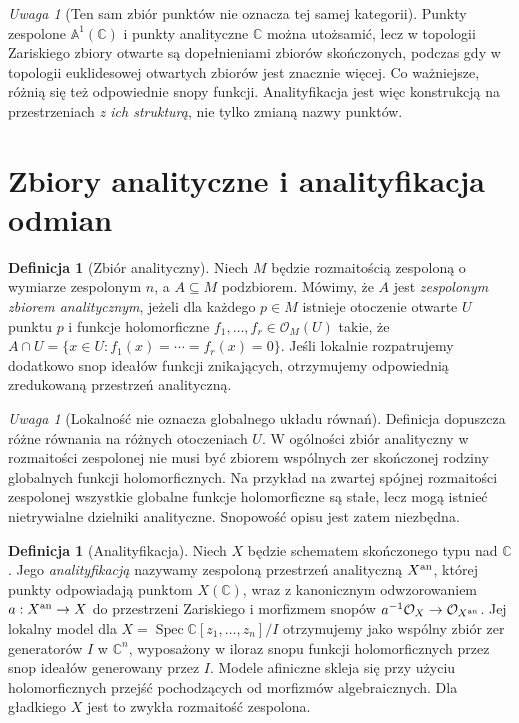 \documentclass[11pt,a4paper,openany]{report}
\numberwithin{equation}{section}
\theoremstyle{plain}
\theoremstyle{definition}
\newtheorem{definicja}[twierdzenie]{Definicja}
\theoremstyle{remark}
\newtheorem{uwaga}[twierdzenie]{Uwaga}
\newcommand{\C}{\mathbb C}
\newcommand{\A}{\mathbb A}
\begin{document}
\begin{uwaga}[Ten sam zbiór punktów nie oznacza tej samej kategorii]
Punkty zespolone $\A^1(\C)$ i punkty analityczne $\C$ można utożsamić,
lecz w topologii Zariskiego zbiory otwarte są dopełnieniami zbiorów
skończonych, podczas gdy w topologii euklidesowej otwartych zbiorów jest
znacznie więcej. Co ważniejsze, różnią się też odpowiednie snopy
funkcji. Analityfikacja jest więc konstrukcją na przestrzeniach
\emph{z ich strukturą}, nie tylko zmianą nazwy punktów.
\end{uwaga}

\section{Zbiory analityczne i analityfikacja odmian}
\label{sec:ga9-analityczne}

\begin{definicja}[Zbiór analityczny]
Niech $M$ będzie rozmaitością zespoloną o wymiarze zespolonym $n$,
a $A\subseteq M$ podzbiorem. Mówimy, że $A$ jest
\emph{zespolonym zbiorem analitycznym}, jeżeli dla każdego $p\in M$
istnieje otoczenie otwarte $U$ punktu $p$ i funkcje holomorficzne
$f_1,\ldots,f_r\in\mathcal O_M(U)$ takie, że
$A\cap U=\{x\in U:f_1(x)=\cdots=f_r(x)=0\}$.
Jeśli lokalnie rozpatrujemy dodatkowo snop ideałów funkcji znikających,
otrzymujemy odpowiednią zredukowaną przestrzeń analityczną.
\end{definicja}

\begin{uwaga}[Lokalność nie oznacza globalnego układu równań]
Definicja dopuszcza różne równania na różnych otoczeniach $U$.
W ogólności zbiór analityczny w rozmaitości zespolonej nie musi być
zbiorem wspólnych zer skończonej rodziny globalnych funkcji
holomorficznych. Na przykład na zwartej spójnej rozmaitości zespolonej
wszystkie globalne funkcje holomorficzne są stałe, lecz mogą istnieć
nietrywialne dzielniki analityczne. Snopowość opisu jest zatem
niezbędna.
\end{uwaga}

\begin{definicja}[Analityfikacja]
Niech $X$ będzie schematem skończonego typu nad $\C$. Jego
\emph{analityfikacją} nazywamy zespoloną przestrzeń analityczną
$X^{\rm an}$, której punkty odpowiadają punktom $X(\C)$,
wraz z kanonicznym odwzorowaniem $a:X^{\rm an}\to X$
do przestrzeni Zariskiego i morfizmem snopów
$a^{-1}\mathcal O_X\to\mathcal O_{X^{\rm an}}$.
Jej lokalny model dla
$X=\operatorname{Spec}\C[z_1,\ldots,z_n]/I$ otrzymujemy jako wspólny
zbiór zer generatorów $I$ w $\C^n$, wyposażony w iloraz snopu
funkcji holomorficznych przez snop ideałów generowany przez $I$.
Modele afiniczne skleja się przy użyciu holomorficznych przejść
pochodzących od morfizmów algebraicznych. Dla gładkiego $X$ jest to
zwykła rozmaitość zespolona.
\end{definicja}
\end{document}
